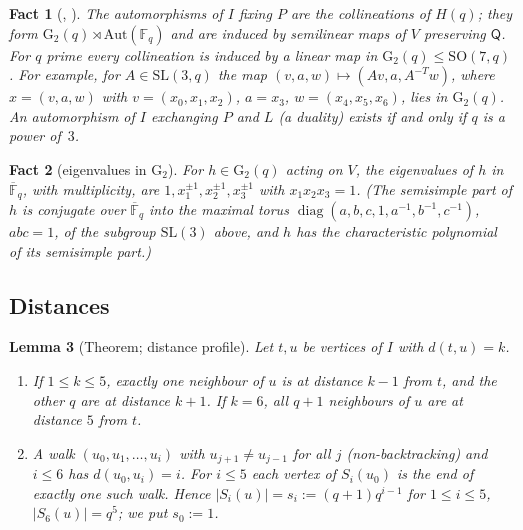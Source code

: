 \documentclass[11pt]{amsart}
\theoremstyle{plain}
\newtheorem{lemma}{Lemma}[section]
\newtheorem{fact}[lemma]{Fact}
\theoremstyle{definition}
\theoremstyle{remark}
\newcommand{\F}{\mathbb{F}}
\newcommand{\Q}{\mathsf{Q}}
\newcommand{\Aut}{\mathrm{Aut}}
\newcommand{\GG}{\mathrm{G}_2}
\newcommand{\pP}{P}  %
\newcommand{\lL}{L}  %
\begin{document}
\begin{fact}[{\cite{Ti59}, \cite{VM98}}]\label{fact:aut}
The automorphisms of $I$ fixing $\pP$ are the collineations of $H(q)$; they form $\GG(q) \rtimes \Aut(\F_q)$ and are
induced by semilinear maps of $V$ preserving $\Q$. For $q$ prime every collineation is induced by a linear map in
$\GG(q) \le \mathrm{SO}(7,q)$. For example, for $A \in \mathrm{SL}(3,q)$ the map $(v, a, w) \mapsto (Av, a, A^{-T}w)$,
where $x = (v,a,w)$ with $v = (x_0,x_1,x_2)$, $a = x_3$, $w = (x_4,x_5,x_6)$, lies in $\GG(q)$. An automorphism of $I$
exchanging $\pP$ and $\lL$ (a \emph{duality}) exists if and only if $q$ is a power of~$3$.
\end{fact}

\begin{fact}[eigenvalues in $\GG$]\label{fact:eig}
For $h \in \GG(q)$ acting on $V$, the eigenvalues of $h$ in $\overline{\F}_q$, with multiplicity, are
$1, x_1^{\pm1}, x_2^{\pm1}, x_3^{\pm1}$ with $x_1x_2x_3 = 1$. (The semisimple part of $h$ is conjugate over
$\overline{\F}_q$ into the maximal torus $\operatorname{diag}(a,b,c,1,a^{-1},b^{-1},c^{-1})$, $abc = 1$, of the subgroup
$\mathrm{SL}(3)$ above, and $h$ has the characteristic polynomial of its semisimple part.)
\end{fact}

\subsection{Distances}

\begin{lemma}[Theorem; distance profile]\label{lem:profile}
Let $t, u$ be vertices of $I$ with $d(t,u) = k$.
\begin{enumerate}[label=(\alph*)]
\item If $1 \le k \le 5$, exactly one neighbour of $u$ is at distance $k-1$ from $t$, and the other $q$ are at distance
  $k+1$. If $k = 6$, all $q+1$ neighbours of $u$ are at distance $5$ from $t$.
\item A walk $(u_0, u_1, \dots, u_i)$ with $u_{j+1} \ne u_{j-1}$ for all $j$ (\emph{non-backtracking}) and $i \le 6$
  has $d(u_0,u_i) = i$. For $i \le 5$ each vertex of $S_i(u_0)$ is the end of exactly one such walk. Hence
  $|S_i(u)| = s_i := (q+1)q^{i-1}$ for $1 \le i \le 5$, $|S_6(u)| = q^5$; we put $s_0 := 1$.
\end{enumerate}
\end{lemma}
\end{document}
